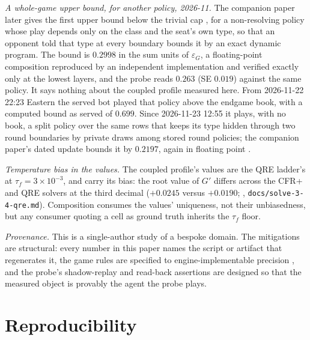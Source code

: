 \documentclass[11pt]{article}
\theoremstyle{plain}
\theoremstyle{definition}
\theoremstyle{remark}
\newcommand{\code}[1]{\texttt{\small #1}}
\newcommand{\game}{\ensuremath{G}}
\newcommand{\gp}{\ensuremath{G'}}
\newcommand{\epsG}{\ensuremath{\varepsilon_{\game}}}
\begin{document}
\emph{A whole-game upper bound, for another policy, 2026-11.} The
companion paper later gives the first upper bound below the trivial
cap \cite{rb3}, for a non-resolving policy whose play depends only on
the class and the seat's own type, so that an opponent told that type
at every boundary bounds it by an exact dynamic program. The bound is
$0.2998$ in the sum units of $\epsG$, a floating-point composition
reproduced by an independent implementation and verified exactly only
at the lowest layers, and the probe reads $0.263$ (SE $0.019$) against
the same policy. It says nothing about the coupled profile measured
here. From 2026-11-22 22:23 Eastern the served bot played that policy
above the endgame book, with a computed bound as served of $0.699$.
Since 2026-11-23 12:55 it plays, with no book, a split policy over the
same rows that keeps its type hidden through two round boundaries by
private draws among stored round policies; the companion paper's dated
update bounds it by $0.2197$, again in floating point \cite{rb3}.

\emph{Temperature bias in the values.} The coupled profile's values are the QRE
ladder's at $\tau_f=3\times10^{-3}$, and carry its bias: the root value
of $\gp$ differs across the CFR+ and QRE solvers at the third decimal
($+0.0245$ versus $+0.0190$; \cite{rb2},
\code{docs/solve-3-4-qre.md}). Composition consumes the values'
uniqueness, not their unbiasedness, but any consumer quoting a cell as
ground truth inherits the $\tau_f$ floor.

\emph{Provenance.} This is a single-author study of a bespoke domain.
The mitigations are structural: every number in this paper names the
script or artifact that regenerates it, the game rules are specified to
engine-implementable precision \cite{rb1}, and the probe's shadow-replay
and read-back assertions are designed so that the measured object is
provably the agent the probe plays.

\section{Reproducibility}\label{sec:repro}
\end{document}
